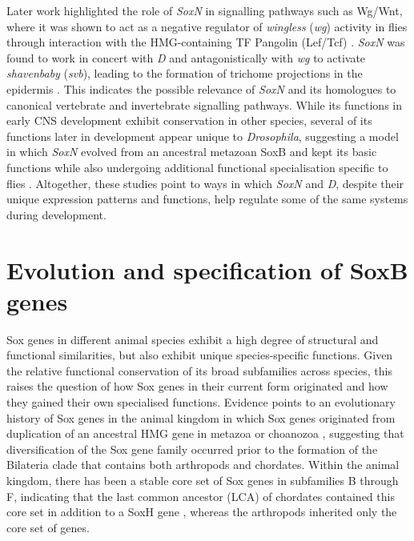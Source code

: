 \documentclass[withindex,glossary]{cam-thesis}
\begin{document}
Later work highlighted the role of \emph{SoxN} in signalling pathways
such as Wg/Wnt, where it was shown to act as a negative regulator of
\emph{wingless} (\emph{wg}) activity in flies through interaction with
the HMG-containing TF Pangolin (Lef/Tcf) .
\emph{SoxN} was found to work in concert with \emph{D} and
antagonistically with \emph{wg} to activate \emph{shavenbaby}
(\emph{svb}), leading to the formation of trichome projections in the
epidermis . This indicates the possible relevance
of \emph{SoxN} and its homologues to canonical vertebrate and
invertebrate signalling pathways. While its functions in early CNS
development exhibit conservation in other species, several of its
functions later in development appear unique to \emph{Drosophila},
suggesting a model in which \emph{SoxN} evolved from an ancestral
metazoan SoxB and kept its basic functions while also undergoing
additional functional specialisation specific to flies . Altogether, these studies point to ways in which \emph{SoxN} and
\emph{D}, despite their unique expression patterns and functions, help
regulate some of the same systems during development.

\section{Evolution and specification of SoxB genes}

Sox genes in different animal species exhibit a high degree of
structural and functional similarities, but also exhibit unique
species-specific functions. Given the relative functional conservation
of its broad subfamilies across species, this raises the question of how
Sox genes in their current form originated and how they gained their own
specialised functions. Evidence points to an evolutionary history of Sox
genes in the animal kingdom in which Sox genes originated from
duplication of an ancestral HMG gene in metazoa or choanozoa , suggesting that diversification of the Sox gene family
occurred prior to the formation of the Bilateria clade that contains
both arthropods and chordates. Within the animal kingdom, there has been
a stable core set of Sox genes in subfamilies B through F, indicating
that the last common ancestor (\gls{LCA}) of chordates contained this core set
in addition to a SoxH gene , whereas the arthropods
inherited only the core set of genes.
\end{document}

